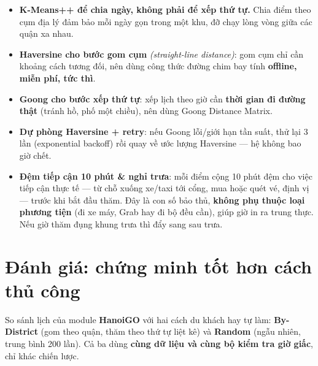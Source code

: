 \documentclass[12pt,a4paper]{article}
\newcommand{\en}[1]{\textit{(#1)}}            %
\begin{document}
\begin{itemize}[nosep]
  \item \textbf{K-Means++ để chia ngày, không phải để xếp thứ tự.} Chia điểm
  theo cụm địa lý đảm bảo mỗi ngày gọn trong một khu, đỡ chạy lòng vòng giữa các
  quận xa nhau.
  \item \textbf{Haversine cho bước gom cụm} \en{straight-line distance}: gom cụm
  chỉ cần khoảng cách tương đối, nên dùng công thức đường chim bay tính
  \textbf{offline, miễn phí, tức thì}.
  \item \textbf{Goong cho bước xếp thứ tự}: xếp lịch theo giờ cần
  \textbf{thời gian đi đường thật} (tránh hồ, phố một chiều), nên dùng Goong
  Distance Matrix.
  \item \textbf{Dự phòng Haversine + retry}: nếu Goong lỗi/giới hạn tần suất, thử
  lại 3 lần (exponential backoff) rồi quay về ước lượng Haversine --- hệ không
  bao giờ chết.
  \item \textbf{Đệm tiếp cận 10 phút \& nghỉ trưa}: mỗi điểm cộng 10 phút đệm cho
  việc tiếp cận thực tế --- từ chỗ xuống xe/taxi tới cổng, mua hoặc quét vé, định
  vị --- trước khi bắt đầu thăm. Đây là con số bảo thủ, \textbf{không phụ thuộc
  loại phương tiện} (đi xe máy, Grab hay đi bộ đều cần), giúp giờ in ra trung
  thực. Nếu giờ thăm đụng khung trưa thì đẩy sang sau trưa.
\end{itemize}

\section{Đánh giá: chứng minh tốt hơn cách thủ công}

So sánh lịch của module \textbf{HanoiGO} với hai cách du khách hay tự làm:
\textbf{By-District} (gom theo quận, thăm theo thứ tự liệt kê) và \textbf{Random}
(ngẫu nhiên, trung bình 200 lần). Cả ba dùng \textbf{cùng dữ liệu và cùng bộ
kiểm tra giờ giấc}, chỉ khác chiến lược.
\end{document}
